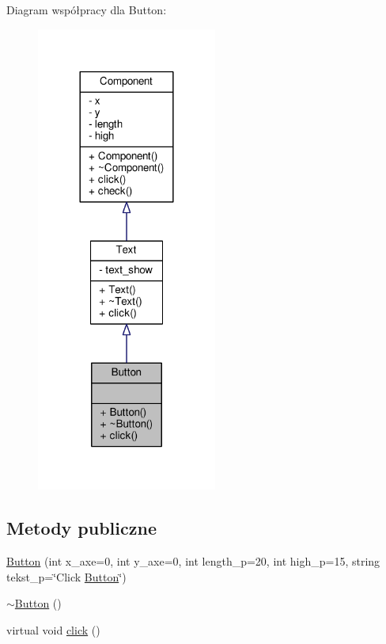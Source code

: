 Diagram współpracy dla Button\+:\nopagebreak
\begin{figure}[H]
\begin{center}
\leavevmode
\includegraphics[width=168pt]{classButton__coll__graph}
\end{center}
\end{figure}
\subsection*{Metody publiczne}
\begin{DoxyCompactItemize}
\item 
\hyperlink{classButton_affc1899d8e846ffda38377637d675d29}{Button} (int x\+\_\+axe=0, int y\+\_\+axe=0, int length\+\_\+p=20, int high\+\_\+p=15, string tekst\+\_\+p=\char`\"{}Click \hyperlink{classButton}{Button}\char`\"{})
\item 
\hyperlink{classButton_a2a001eb9c3cc8ae54768a850dd345002}{$\sim$\+Button} ()
\item 
virtual void \hyperlink{classButton_a2fc33ec22217562b28ac6f02bda26c6e}{click} ()
\end{DoxyCompactItemize}


